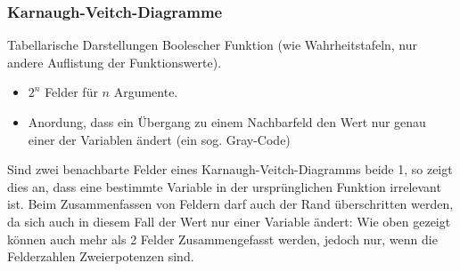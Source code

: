 \documentclass[12pt]{report}
\begin{document}
\pagebreak
\subsubsection{Karnaugh-Veitch-Diagramme}
\begin{defbox}
  Tabellarische Darstellungen Boolescher
  Funktion (wie Wahrheitstafeln, nur andere Auflistung der Funktionswerte).
  \begin{itemize}
    \item $2^n$ Felder für $n$ Argumente.
    \item Anordung, dass ein Übergang zu einem Nachbarfeld den Wert nur genau einer der Variablen ändert (ein sog. Gray-Code)
  \end{itemize}
\end{defbox}


Sind zwei benachbarte Felder eines Karnaugh-Veitch-Diagramms beide 1, so zeigt dies an, dass eine bestimmte Variable in der ursprünglichen Funktion irrelevant ist.
Beim Zusammenfassen von Feldern darf auch der Rand überschritten werden, da sich auch in diesem Fall der Wert nur einer Variable ändert:
Wie oben gezeigt können auch mehr als 2 Felder Zusammengefasst werden, jedoch nur, wenn die Felderzahlen Zweierpotenzen sind.
\end{document}
